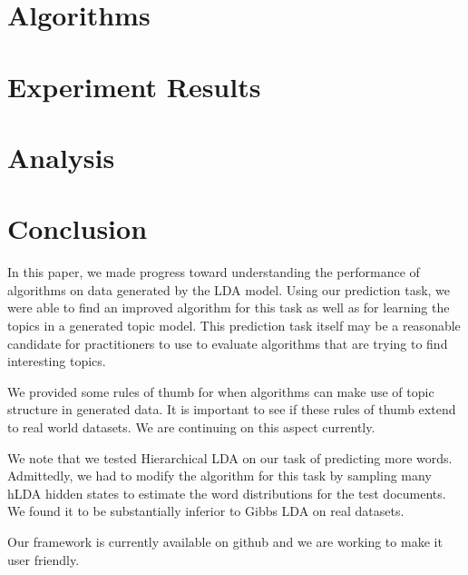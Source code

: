 \documentclass{sig-alternate}
\begin{document}
\section{Algorithms}
\label{sec:algs}

\section{Experiment Results}
\label{sec:results}


\section{Analysis}
\label{sec:analysis}


\section{Conclusion}
\label{sec:conclusion}

In this paper, we made progress toward understanding the performance
of algorithms on data generated by the LDA model.  Using our
prediction task, we were able to find an improved algorithm for this
task as well as for learning the topics in a generated topic model.
This prediction task itself may be a reasonable candidate for
practitioners to use to evaluate algorithms that are trying to find
interesting topics.

We provided some rules of thumb for when algorithms can make use of
topic structure in generated data.  It is important to see if these
rules of thumb extend to real world datasets.  We are continuing on
this aspect currently.

We note that we tested Hierarchical LDA on our task
of predicting more words.  Admittedly, we had to
modify the algorithm for this task by sampling
many hLDA hidden states to estimate the word
distributions for the test documents.  We found
it to be substantially inferior to Gibbs LDA
on real datasets. 

Our framework is currently available on github and we are working to
make it user friendly. 




\end{document}
